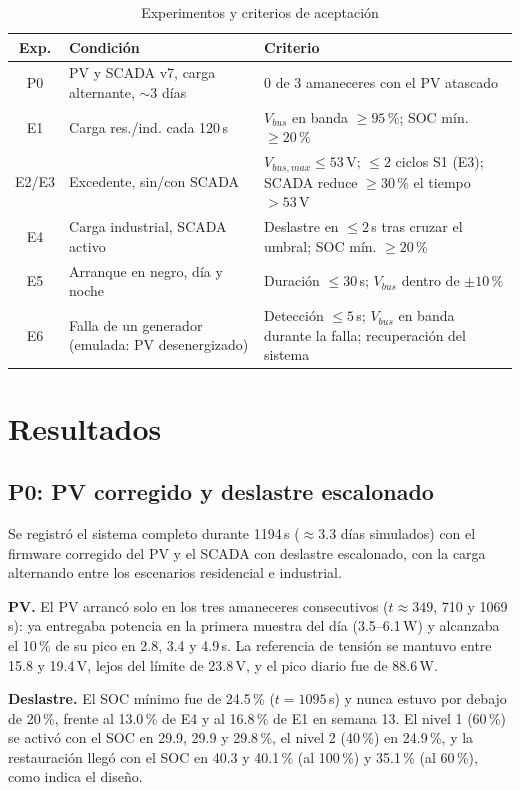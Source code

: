 \documentclass[conference]{IEEEtran}
\begin{document}
\begin{table}[H]
\caption{Experimentos y criterios de aceptación}
\label{tab:crit}
\centering
\scriptsize\setlength{\tabcolsep}{2.5pt}
\begin{tabular}{|c|p{2.0cm}|p{3.5cm}|}
\hline
\textbf{Exp.} & \textbf{Condición} & \textbf{Criterio} \\
\hline
P0 & PV y SCADA v7, carga alternante, $\sim$3 días & 0 de 3 amaneceres con el PV atascado \\ \hline
E1 & Carga res./ind. cada 120\,s & $V_{bus}$ en banda $\ge95\,\%$; SOC mín. $\ge20\,\%$ \\ \hline
E2/E3 & Excedente, sin/con SCADA & $V_{bus,max}\le53$\,V; $\le2$ ciclos S1 (E3); SCADA reduce $\ge30\,\%$ el tiempo $>53$\,V \\ \hline
E4 & Carga industrial, SCADA activo & Deslastre en $\le2$\,s tras cruzar el umbral; SOC mín. $\ge20\,\%$ \\ \hline
E5 & Arranque en negro, día y noche & Duración $\le30$\,s; $V_{bus}$ dentro de $\pm10\,\%$ \\ \hline
E6 & Falla de un generador (emulada: PV desenergizado) & Detección $\le5$\,s; $V_{bus}$ en banda durante la falla; recuperación del sistema \\ \hline
\end{tabular}
\end{table}

\section{Resultados}

\subsection{P0: PV corregido y deslastre escalonado}
\label{sec:p0}

Se registró el sistema completo durante 1194\,s ($\approx$3.3 días simulados) con el firmware corregido del PV y el SCADA con deslastre escalonado, con la carga alternando entre los escenarios residencial e industrial.


\textbf{PV.} El PV arrancó solo en los tres amaneceres consecutivos ($t\approx349$, 710 y 1069\,s): ya entregaba potencia en la primera muestra del día (3.5--6.1\,W) y alcanzaba el 10\,\% de su pico en 2.8, 3.4 y 4.9\,s. La referencia de tensión se mantuvo entre 15.8 y 19.4\,V, lejos del límite de 23.8\,V, y el pico diario fue de 88.6\,W.

\textbf{Deslastre.} El SOC mínimo fue de 24.5\,\% ($t=1095$\,s) y nunca estuvo por debajo de 20\,\%, frente al 13.0\,\% de E4 y al 16.8\,\% de E1 en semana 13. El nivel 1 (60\,\%) se activó con el SOC en 29.9, 29.9 y 29.8\,\%, el nivel 2 (40\,\%) en 24.9\,\%, y la restauración llegó con el SOC en 40.3 y 40.1\,\% (al 100\,\%) y 35.1\,\% (al 60\,\%), como indica el diseño.
\end{document}
